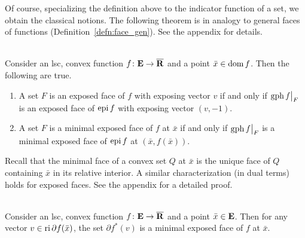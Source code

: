 \documentclass[smallextended,numbook]{svjour3}
\begin{document}
Of course, specializing the definition above to the indicator function of a set, we obtain the classical notions. The following theorem is in analogy to general faces of functions (Definition~\ref{defn:face_gen}). See the appendix for details.
\begin{thm}\label{thm:epi_coh} {\hfill \\}
Consider an lsc, convex function $f\colon{{\bf E}}\to\overline{{\bf R}}$ and a point $\bar{x}\in{\mbox{\rm dom}\,} f$. Then the following are true.
\begin{enumerate}
\item  A set $F$ is an exposed face of $f$ with exposing vector $v$ if and only if ${\mbox{\rm gph}\,} f\big|_F$ is an exposed face of ${\mbox{\rm epi}\,} f$ with exposing vector $(v,-1)$.
\item A set $F$ is a minimal exposed face of $f$ at $\bar{x}$ if and only if ${\mbox{\rm gph}\,} f\big|_F$ is a minimal exposed face of ${\mbox{\rm epi}\,} f$ at $(\bar{x},f(\bar{x}))$.
\end{enumerate}
\end{thm}

Recall that the minimal face of a convex set $Q$ at $\bar{x}$ is the unique face of $Q$ containing $\bar{x}$ in its relative interior. A similar characterization (in dual terms) holds for exposed faces. See the appendix for a detailed proof.
\begin{thm} \label{thm:min_func_rep}{\hfill \\}
Consider an lsc, convex function $f\colon{{\bf E}}\to\overline{{\bf R}}$ and a point $\bar{x}\in{{\bf E}}$. Then for any vector $v\in{\mbox{\rm ri}\,}\partial f(\bar{x})$, the set $\partial f^{*}(v)$ is a minimal exposed face of $f$ at $\bar{x}$.
\end{thm}
\end{document}
